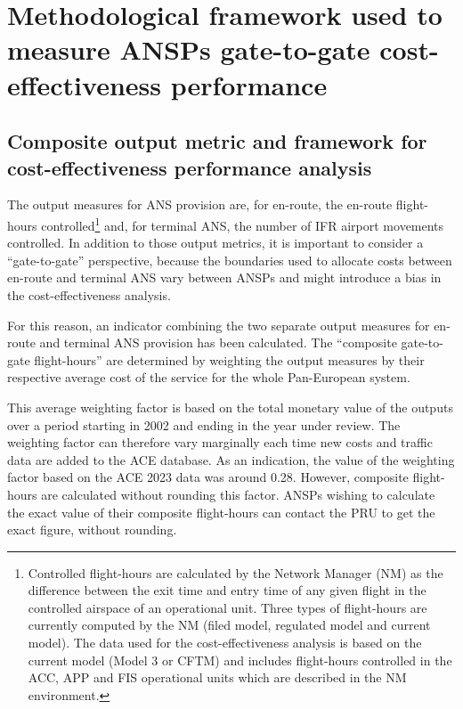 \documentclass[
  11pt,
  a4paperpaper,
  openany,headsepline=on,footsepline=off,DIV=12,table]{scrbook}
\begin{document}

\chapter{Methodological framework used to measure ANSPs gate-to-gate
cost-effectiveness performance}\label{sec-method}

\section{Composite output metric and framework for cost-effectiveness
performance analysis}\label{sec-metric-and-framework}

The output measures for ANS provision are, for en-route, the en-route
flight-hours controlled\footnote{Controlled flight-hours are calculated
  by the Network Manager (NM) as the difference between the exit time
  and entry time of any given flight in the controlled airspace of an
  operational unit. Three types of flight-hours are currently computed
  by the NM (filed model, regulated model and current model). The data
  used for the cost-effectiveness analysis is based on the current model
  (Model 3 or CFTM) and includes flight-hours controlled in the ACC, APP
  and FIS operational units which are described in the NM environment.}
and, for terminal ANS, the number of IFR airport movements controlled.
In addition to those output metrics, it is important to consider a
``gate-to-gate'' perspective, because the boundaries used to allocate
costs between en-route and terminal ANS vary between ANSPs and might
introduce a bias in the cost-effectiveness analysis.

For this reason, an indicator combining the two separate output measures
for en-route and terminal ANS provision has been calculated. The
``composite gate-to-gate flight-hours'' are determined by weighting the
output measures by their respective average cost of the service for the
whole Pan-European system.

This average weighting factor is based on the total monetary value of
the outputs over a period starting in 2002 and ending in the year under
review. The weighting factor can therefore vary marginally each time new
costs and traffic data are added to the ACE database. As an indication,
the value of the weighting factor based on the ACE 2023 data was around
0.28. However, composite flight-hours are calculated without rounding
this factor. ANSPs wishing to calculate the exact value of their
composite flight-hours can contact the PRU to get the exact figure,
without rounding.
\end{document}
